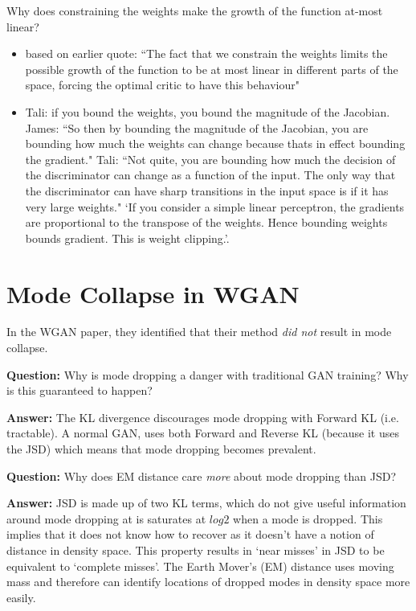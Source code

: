 \documentclass{article}
\begin{document}
	Why does constraining the weights make the growth of the function at-most linear?
	\begin{itemize}
		\item based on earlier quote: ``The fact that we constrain the weights limits the possible growth of the function to be at most linear in different parts of the space, forcing the optimal critic to have this behaviour"
		\item Tali: if you bound the weights, you bound the magnitude of the Jacobian. James: ``So then by bounding the magnitude of the Jacobian, you are bounding how much the weights can change because thats in effect bounding the gradient." Tali: ``Not quite, you are bounding how much the decision of the discriminator can change as a function of the input. The only way that the discriminator can have sharp transitions in the input space is if it has very large weights." `If you consider a simple linear perceptron, the gradients are proportional to the transpose of the weights. Hence bounding weights bounds gradient. This is weight clipping.'.
	\end{itemize}				
	




\section{Mode Collapse in WGAN} %
In the WGAN paper, they identified that their method \textit{did not} result in mode collapse. 

\textbf{Question:} Why is mode dropping a danger with traditional GAN training? Why is this guaranteed to happen?

\textbf{Answer:} The KL divergence  discourages mode dropping with Forward KL (i.e. tractable). A normal GAN, uses both Forward and Reverse KL (because it uses the JSD) which means that mode dropping becomes prevalent. 

\textbf{Question:} Why does EM distance care \textit{more} about mode dropping than JSD?

\textbf{Answer:} JSD is made up of two KL terms, which do not give useful information around mode dropping at is saturates at $log2$ when a mode is dropped. This implies that it does not know how to recover as it doesn't have a notion of distance in density space. This property results in `near misses' in JSD to be equivalent to `complete misses'. The Earth Mover's (EM) distance uses moving mass and therefore can identify locations of dropped modes in density space more easily.  
\end{document}
